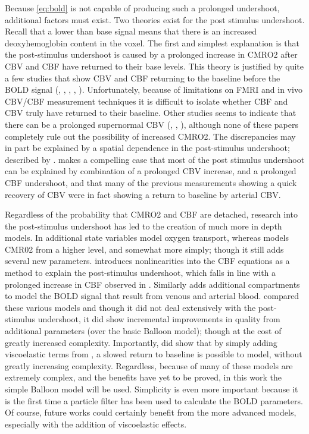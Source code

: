 Because \autoref{eq:bold} is not capable of producing such a prolonged undershoot,
additional factors must exist.  Two theories exist for the post stimulus undershoot.
Recall
that a lower than base signal means that there is an increased deoxyhemoglobin
content in the voxel. The first and simplest explanation is that the post-stimulus
undershoot is caused by a prolonged increase in CMRO2 after CBV and CBF
have returned to their base levels. This theory is justified by quite a few
studies that show CBV and CBF returning to the baseline before the BOLD signal
(\cite{Frahm2008}, \cite{Donahue2009}, \cite{Buxton2004}, \cite{Lu2004},
\cite{Shen2008}). Unfortunately, because of limitations on FMRI and in vivo
CBV/CBF measurement techniques it is difficult to isolate whether CBF and
CBV truly have returned to their baseline. Other studies seems to indicate
that there can be a prolonged supernormal CBV (\cite{Mandeville1999a}, 
\cite{Behzadi2005}, \cite{Chen2009a}), although none of these papers completely
rule out the possibility of increased CMRO2. The discrepancies may in part
be explained by a spatial dependence in the post-stimulus undershoot; described
by \cite{Yacoub2006}. \cite{Chen2009}
makes a compelling case that most of the post stimulus undershoot can be 
explained by combination of a prolonged CBV increase, and a prolonged CBF 
undershoot, and that
many of the previous measurements showing a quick recovery of CBV 
were in fact showing a return to baseline by arterial CBV.

Regardless of the probability that CMRO2 and CBF are detached,
research into the post-stimulus undershoot has led to the creation
of much more in depth models. In \cite{Zheng2002} additional state
variables model oxygen transport, whereas \cite{Buxton2004} models
CMR02 from a higher level, and somewhat more simply; though it 
still adds several new parameters. \cite{Behzadi2005}
introduces nonlinearities into the CBF equations as a method to
explain the post-stimulus undershoot, which falls in line with a 
prolonged increase in CBF observed in \cite{Chen2009}. Similarly
\cite{Zheng2005} adds additional compartments to model the BOLD signal
that result from venous and arterial blood. 
\cite{Deneux2006} compared these various models and though it did 
not deal extensively with the 
post-stimulus undershoot, it did show incremental improvements
in quality from additional parameters (over the basic Balloon model);
though at the cost of greatly increased complexity.
Importantly,\cite{Deneux2006} did show that by 
simply adding viscoelastic terms from \cite{Buxton2004}, a slowed return 
to baseline is possible to model, without greatly increasing
complexity. Regardless, because of many of these models are extremely
complex, and the benefits have yet to be proved, in this work the simple
Balloon model will be used. Simplicity is even more important because
it is the first time a particle filter has been used to calculate the
BOLD parameters. Of course, future works could certainly benefit from
the more advanced models, especially with the addition of viscoelastic
effects.

